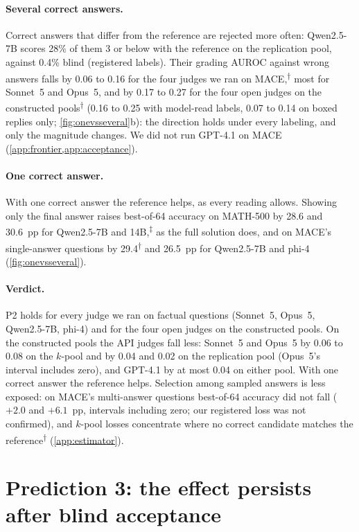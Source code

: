 \documentclass{article}
\newcommand{\reana}{\textsuperscript{$\ddagger$}}
\newcommand{\ph}{\textsuperscript{$\dagger$}}
\begin{document}
\paragraph{Several correct answers.}
Correct answers that differ from the reference are rejected more often: Qwen2.5-7B scores 28\% of them 3 or below with the reference on the replication pool, against 0.4\% blind (registered labels). Their grading AUROC against wrong answers falls by 0.06 to 0.16 for the four judges we ran on \textsc{MACE},\ph{} most for Sonnet~5 and Opus~5, and by 0.17 to 0.27 for the four open judges on the constructed pools\ph{} (0.16 to 0.25 with model-read labels, 0.07 to 0.14 on boxed replies only; \cref{fig:onevsseveral}b): the direction holds under every labeling, and only the magnitude changes. We did not run GPT-4.1 on \textsc{MACE} (\cref{app:frontier,app:acceptance}).

\paragraph{One correct answer.}
With one correct answer the reference helps, as every reading allows. Showing only the final answer raises best-of-64 accuracy on MATH-500 by 28.6 and 30.6~pp for Qwen2.5-7B and 14B,\reana{} as the full solution does, and on \textsc{MACE}'s single-answer questions by 29.4\ph{} and 26.5~pp for Qwen2.5-7B and phi-4 (\cref{fig:onevsseveral}).

\paragraph{Verdict.} P2 holds for every judge we ran on factual questions (Sonnet~5, Opus~5, Qwen2.5-7B, phi-4) and for the four open judges on the constructed pools. On the constructed pools the API judges fall less: Sonnet~5 and Opus~5 by 0.06 to 0.08 on the $k$-pool and by 0.04 and 0.02 on the replication pool (Opus~5's interval includes zero), and GPT-4.1 by at most 0.04 on either pool. With one correct answer the reference helps. Selection among sampled answers is less exposed: on \textsc{MACE}'s multi-answer questions best-of-64 accuracy did not fall ($+2.0$ and $+6.1$~pp, intervals including zero; our registered loss was not confirmed), and $k$-pool losses concentrate where no correct candidate matches the reference\ph{} (\cref{app:estimator}).

\section{Prediction 3: the effect persists after blind acceptance}
\label{sec:p3}
\end{document}
